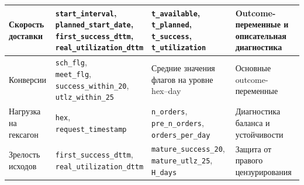 \documentclass[14pt,a4paper]{extarticle}
\begin{document}
\begin{table}[H]
\begin{tabularx}{\textwidth}{
        >{\RaggedRight\arraybackslash}p{2.6cm}
        >{\RaggedRight\arraybackslash}X
        >{\RaggedRight\arraybackslash}X
        >{\RaggedRight\arraybackslash}p{3.0cm}
    }
        Скорость доставки
        &
        \makecell[tl]{
            \texttt{start\_interval},\\
            \texttt{planned\_start\_date},\\
            \texttt{first\_success\_dttm},\\
            \texttt{real\_utilization\_dttm}
        }
        &
        \makecell[tl]{
            \texttt{t\_available},\\
            \texttt{t\_planned},\\
            \texttt{t\_success},\\
            \texttt{t\_utilization}
        }
        &
        Outcome-переменные и описательная диагностика \\
        \midrule

        Конверсии
        &
        \makecell[tl]{
            \texttt{sch\_flg},\\
            \texttt{meet\_flg},\\
            \texttt{success\_within\_20},\\
            \texttt{utlz\_within\_25}
        }
        &
        Средние значения флагов на уровне hex--day
        &
        Основные outcome-переменные \\
        \midrule

        Нагрузка на гексагон
        &
        \makecell[tl]{
            \texttt{hex},\\
            \texttt{request\_timestamp}
        }
        &
        \makecell[tl]{
            \texttt{n\_orders},\\
            \texttt{pre\_n\_orders},\\
            \texttt{orders\_per\_day}
        }
        &
        Диагностика баланса и устойчивости \\
        \midrule

        Зрелость исходов
        &
        \makecell[tl]{
            \texttt{first\_success\_dttm},\\
            \texttt{real\_utilization\_dttm}
        }
        &
        \makecell[tl]{
            \texttt{mature\_success\_20},\\
            \texttt{mature\_utlz\_25},\\
            \texttt{H\_days}
        }
        &
        Защита от правого цензурирования \\
        \bottomrule
    \end{tabularx}
\end{table}
\end{document}
